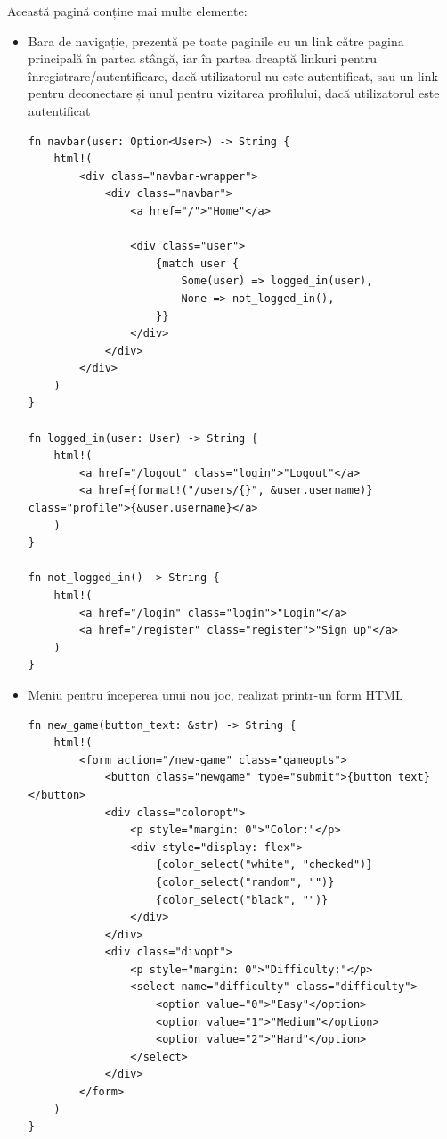 Această pagină conține mai multe elemente:
\begin{itemize}
	\item Bara de navigație, prezentă pe toate paginile cu un link către pagina
	      principală în partea stângă, iar în partea dreaptă linkuri pentru
	      înregistrare/autentificare, dacă utilizatorul nu este autentificat,
	      sau un link pentru deconectare și unul pentru vizitarea profilului, dacă
	      utilizatorul este autentificat

	      \begin{lstlisting}[language=RustHtml]
fn navbar(user: Option<User>) -> String {
    html!(
        <div class="navbar-wrapper">
            <div class="navbar">
                <a href="/">"Home"</a>

                <div class="user">
                    {match user {
                        Some(user) => logged_in(user),
                        None => not_logged_in(),
                    }}
                </div>
            </div>
        </div>
    )
}

fn logged_in(user: User) -> String {
    html!(
        <a href="/logout" class="login">"Logout"</a>
        <a href={format!("/users/{}", &user.username)} class="profile">{&user.username}</a>
    )
}

fn not_logged_in() -> String {
    html!(
        <a href="/login" class="login">"Login"</a>
        <a href="/register" class="register">"Sign up"</a>
    ) 
}
\end{lstlisting}

	\item Meniu pentru începerea unui nou joc, realizat printr-un form HTML

	      \begin{lstlisting}[language=RustHtml]
fn new_game(button_text: &str) -> String {
    html!(
        <form action="/new-game" class="gameopts">
            <button class="newgame" type="submit">{button_text}</button>
            <div class="coloropt">
                <p style="margin: 0">"Color:"</p>
                <div style="display: flex">
                    {color_select("white", "checked")}
                    {color_select("random", "")}
                    {color_select("black", "")}
                </div>
            </div>
            <div class="divopt">
                <p style="margin: 0">"Difficulty:"</p>
                <select name="difficulty" class="difficulty">
                    <option value="0">"Easy"</option>
                    <option value="1">"Medium"</option>
                    <option value="2">"Hard"</option>
                </select>
            </div>
        </form>
    )
}


\end{lstlisting}
\end{itemize}
